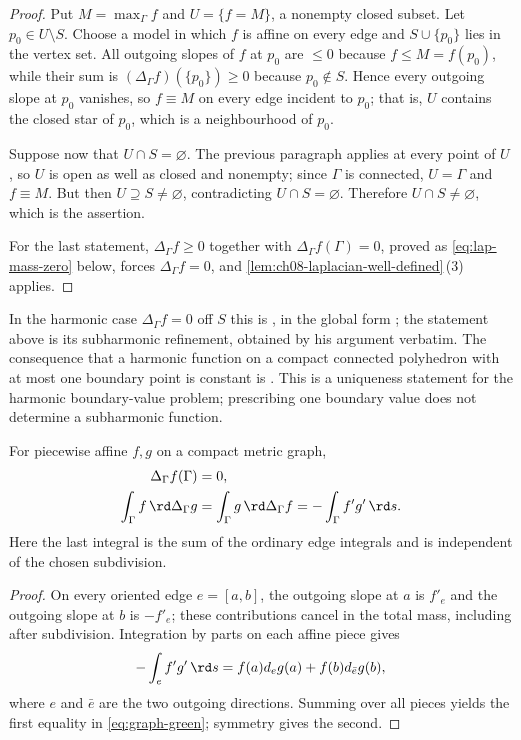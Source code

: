 \begin{proof}
Put $M=\max_\Gamma f$ and $U=\{f=M\}$, a nonempty closed subset.  Let
$p_0\in U\setminus S$.  Choose a model in which $f$ is affine on every edge
and $S\cup\{p_0\}$ lies in the vertex set.  All outgoing slopes of $f$ at
$p_0$ are $\leq0$ because $f\leq M=f(p_0)$, while their sum is
$(\Delta_\Gamma f)(\{p_0\})\geq0$ because $p_0\notin S$.  Hence every
outgoing slope at $p_0$ vanishes, so $f\equiv M$ on every edge incident to
$p_0$; that is, $U$ contains the closed star of $p_0$, which is a
neighbourhood of $p_0$.

Suppose now that $U\cap S=\varnothing$.  The previous paragraph applies at
every point of $U$, so $U$ is open as well as closed and nonempty; since
$\Gamma$ is connected, $U=\Gamma$ and $f\equiv M$.  But then
$U\supseteq S\neq\varnothing$, contradicting $U\cap S=\varnothing$.
Therefore $U\cap S\neq\varnothing$, which is the assertion.

For the last statement, $\Delta_\Gamma f\geq0$ together with
$\Delta_\Gamma f(\Gamma)=0$, proved as \eqref{eq:lap-mass-zero} below, forces
$\Delta_\Gamma f=0$, and \cref{lem:ch08-laplacian-well-defined}\,(3) applies.
\end{proof}

In the harmonic case $\Delta_\Gamma f=0$ off $S$ this is
\cite[Prop.~1.2.9]{Thu05}, in the global form \cite[Cor.~1.2.10]{Thu05}; the
statement above is its subharmonic refinement, obtained by his argument
verbatim.  The consequence that a harmonic function on a compact connected
polyhedron with at most one boundary point is constant is
\cite[Cor.~1.2.11]{Thu05}.  This is a uniqueness statement for the harmonic
boundary-value problem; prescribing one boundary value does not determine
a subharmonic function.

\begin{proposition}\label{prop:graph-green}
For piecewise affine $f,g$ on a compact metric graph,
\begin{align}
 \Delta_\Gamma f(\Gamma)&=0,\label{eq:lap-mass-zero}\\
 \int_\Gamma f\,\rd \Delta_\Gamma g
 &=\int_\Gamma g\,\rd \Delta_\Gamma f
 =-\int_\Gamma f'g'\,\rd s.\label{eq:graph-green}
\end{align}
Here the last integral is the sum of the ordinary edge integrals and is
independent of the chosen subdivision.
\end{proposition}

\begin{proof}
On every oriented edge $e=[a,b]$, the outgoing slope at $a$ is $f'_e$ and
the outgoing slope at $b$ is $-f'_e$; these contributions cancel in the
total mass, including after subdivision.  Integration by parts on each
affine piece gives
\[
 -\int_e f'g'\,\rd s
 =f(a)d_eg(a)+f(b)d_{\bar e}g(b),
\]
where $e$ and $\bar e$ are the two outgoing directions.  Summing over all
pieces yields the first equality in \eqref{eq:graph-green}; symmetry gives
the second.
\end{proof}


